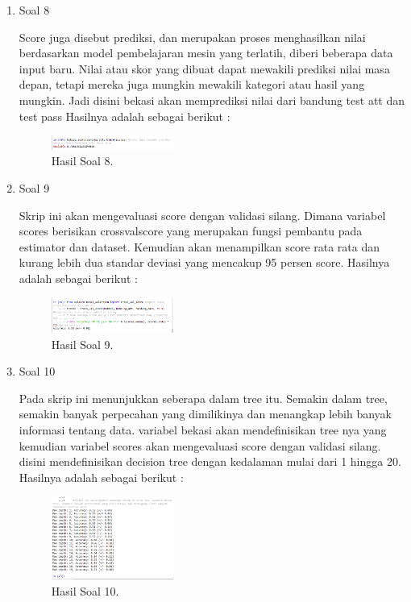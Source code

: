 \begin{enumerate}
	\item Soal 8
	\hfill\break
	
	Score juga disebut prediksi, dan merupakan proses menghasilkan nilai berdasarkan model pembelajaran mesin yang terlatih, diberi beberapa data input baru. Nilai atau skor yang dibuat dapat mewakili prediksi nilai masa depan, tetapi mereka juga mungkin mewakili kategori atau hasil yang mungkin. Jadi disini bekasi akan memprediksi nilai dari bandung test att dan test pass Hasilnya adalah sebagai berikut :
	\begin{figure}[H]
	\centering
		\includegraphics[width=4cm]{figures/1174096/tugas2/2/hasil8.PNG}
		\caption{Hasil Soal 8.}
	\end{figure}

	\item Soal 9
	\hfill\break
	
	Skrip ini akan mengevaluasi score dengan validasi silang. Dimana variabel scores berisikan crossvalscore yang merupakan fungsi pembantu pada estimator dan dataset. Kemudian akan menampilkan score rata rata dan kurang lebih dua standar deviasi yang mencakup 95 persen score. Hasilnya adalah sebagai berikut :
	\begin{figure}[H]
	\centering
		\includegraphics[width=4cm]{figures/1174096/tugas2/2/hasil9.PNG}
		\caption{Hasil Soal 9.}
	\end{figure}

	\item Soal 10
	\hfill\break
	
	Pada skrip ini menunjukkan seberapa dalam tree itu. Semakin dalam tree, semakin banyak perpecahan yang dimilikinya dan menangkap lebih banyak informasi tentang data. variabel bekasi akan mendefinisikan tree nya yang kemudian variabel scores akan mengevaluasi score dengan validasi silang. disini mendefinisikan decision tree dengan kedalaman mulai dari 1 hingga 20. Hasilnya adalah sebagai berikut :
	\begin{figure}[H]
	\centering
		\includegraphics[width=4cm]{figures/1174096/tugas2/2/hasil10.PNG}
		\caption{Hasil Soal 10.}
	\end{figure}


\end{enumerate}
